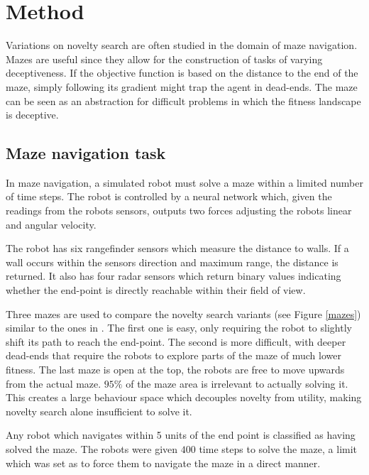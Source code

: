 \section{Method}
Variations on novelty search are often studied in the domain of maze navigation. Mazes are useful
since they allow for the construction of tasks of varying deceptiveness. If the objective function is
based on the distance to the end of the maze, simply following its gradient might trap the agent in
dead-ends. The maze can be seen as an abstraction for difficult problems in which the fitness
landscape is deceptive.

\subsection{Maze navigation task}
In maze navigation, a simulated robot must solve a maze within a limited number of time steps.
The robot is controlled by a neural network which, given the readings from the robots sensors,
outputs two forces adjusting the robots linear and angular velocity.

The robot has six rangefinder sensors which measure the distance to walls. If a wall occurs within the sensors
direction and maximum range, the distance is returned. It also has four radar sensors which return binary
values indicating whether the end-point is directly reachable within their field of view.

Three mazes are used to compare the novelty search variants (see Figure \ref{mazes}) similar to the ones in \cite{ns_study, novelty_alone}.
The first one is easy, only requiring the robot to slightly shift its path to reach the end-point. The second is more
difficult, with deeper dead-ends that require the robots to explore parts of the maze of much lower fitness.
The last maze is open at the top, the robots are free to move upwards from the actual maze.
$95 \%$ of the maze area is irrelevant to actually solving it. This creates a
large behaviour space which decouples novelty from utility, making novelty search alone insufficient
to solve it.

Any robot which navigates within 5 units of the end point is classified as having solved the maze. The robots
were given $400$ time steps to solve the maze, a limit which was set as to force them to navigate the maze
in a direct manner.


